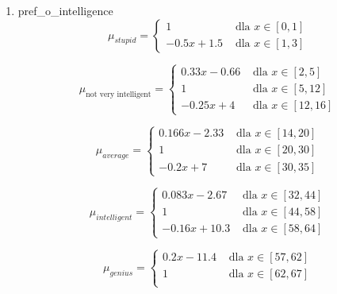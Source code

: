 \documentclass{classrep}
\begin{document}
\begin{enumerate}
  \item pref\_o\_intelligence
  \begin{equation}
    \mu_{stupid} =
      \begin{cases}
        1 & \text{ dla } x \in [0 ,1] \\
        -0.5x+1.5 & \text{ dla } x \in [1,3]       
      \end{cases}  
  \end{equation}

  \begin{equation}
    \mu_{\text{not very intelligent}} =
      \begin{cases}
        0.33x-0.66 & \text{ dla } x \in [2,5]\\
        1 & \text{ dla } x \in [5,12] \\
        -0.25x+4 & \text{ dla } x \in [12,16]       
      \end{cases}  
  \end{equation}

  \begin{equation}
    \mu_{average} =
      \begin{cases}
        0.166x-2.33 & \text{ dla } x \in [14,20]\\
        1 & \text{ dla } x \in [20,30] \\
        -0.2x+7 & \text{ dla } x \in [30,35]       
      \end{cases}  
  \end{equation}

  \begin{equation}
    \mu_{intelligent} =
      \begin{cases}
        0.083x-2.67 & \text{ dla } x \in [32,44]\\
        1 & \text{ dla } x \in [44,58] \\
        -0.16x+10.3 & \text{ dla } x \in [58,64]       
      \end{cases}  
  \end{equation}

  \begin{equation}
    \mu_{genius} =
      \begin{cases}
        0.2x-11.4 & \text{ dla } x \in [57,62] \\
        1 & \text{ dla } x \in [62,67] \\   
      \end{cases}  
  \end{equation}
  

\end{enumerate}
\end{document}
